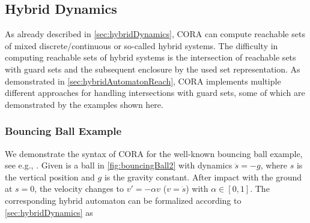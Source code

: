 \subsection{Hybrid Dynamics}

As already described in \cref{sec:hybridDynamics}, CORA can compute reachable sets of mixed discrete/continuous or so-called hybrid systems. The difficulty in computing reachable sets of hybrid systems is the intersection of reachable sets with guard sets and the subsequent enclosure by the used set representation. As demonstrated in \cref{sec:hybridAutomatonReach}, CORA implements multiple different approaches for handling intersections with guard sets, some of which are demonstrated by the examples shown here.

\subsubsection{Bouncing Ball Example} \label{sec:bouncingBallExample}


We demonstrate the syntax of CORA for the well-known bouncing ball example, see e.g., \cite[Section 2.2.3]{Schaft2000}. 
Given is a ball in \cref{fig:bouncingBall2} with dynamics $\ddot{s} = -g$, where $s$ is the vertical position and $g$ is the gravity constant. After impact with the ground at $s=0$, the velocity changes to $v' = -\alpha v$ ($v=\dot{s}$) with $\alpha \in [0,1]$.
The corresponding hybrid automaton can be formalized according to \cref{sec:hybridDynamics} as

